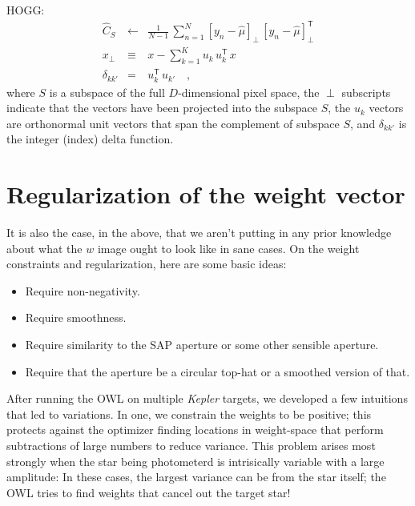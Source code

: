 \documentclass[12pt, letterpaper, preprint]{aastex}
\newcommand{\project}[1]{\textsl{#1}}
\newcommand{\transpose}[1]{{#1}^{\!\mathsf T}}
\begin{document}
HOGG:
\begin{eqnarray}
\hat{C}_S & \leftarrow & \frac{1}{N-1}\,\sum_{n=1}^N [y_n - \hat{\mu}]_\perp\,\transpose{[y_n - \hat{\mu}]}_\perp
\\
x_\perp & \equiv & x - \sum_{k=1}^K u_k\,\transpose{u}_k\,x
\\
\delta_{kk'} &=& \transpose{u}_k\,u_{k'}
\quad ,
\end{eqnarray}
where $S$ is a subspace of the full $D$-dimensional pixel space,
  the $\perp$ subscripts indicate that the vectors have been projected into the subspace $S$,
  the $u_k$ vectors are orthonormal unit vectors that span the complement of subspace $S$,
  and $\delta_{kk'}$ is the integer (index) delta function.


\section{Regularization of the weight vector}

It is also the case, in the above, that
  we aren't putting in any prior knowledge about what the $w$ image ought to look like
  in sane cases.
On the weight constraints and regularization, here are some basic ideas:
\begin{itemize}
\item
Require non-negativity.
\item
Require smoothness.
\item
Require similarity to the SAP aperture or some other sensible aperture.
\item
Require that the aperture be a circular top-hat or a smoothed version of that.
\end{itemize}

After running the OWL on multiple \project{Kepler} targets,
  we developed a few intuitions that led to variations.
In one, we constrain the weights to be positive;
  this protects against the optimizer finding locations in weight-space
  that perform subtractions of large numbers to reduce variance.
This problem arises most strongly when the star being photometerd is intrisically variable
  with a large amplitude:
In these cases, the largest variance can be from the star itself;
  the OWL tries to find weights that cancel out the target star!
\end{document}
